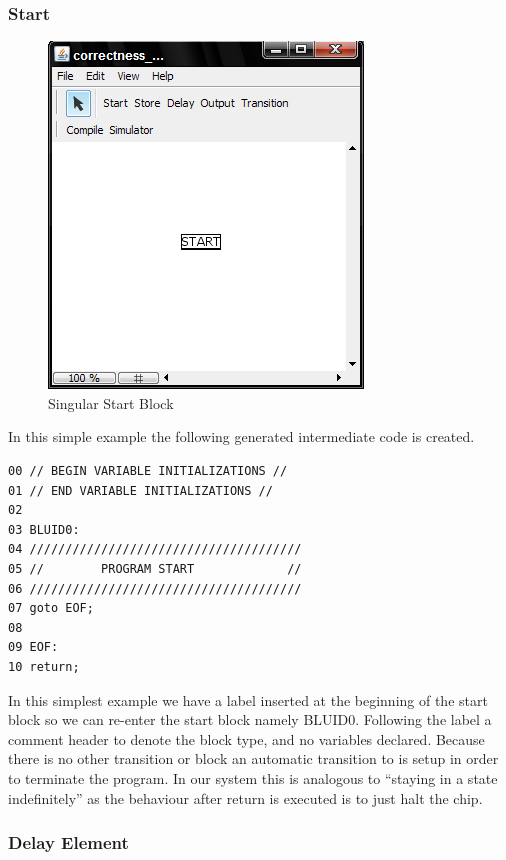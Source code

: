 \subsubsection{Start}
\begin{figure}[htb]
	\centering
	\includegraphics[width=\imgmedphoto]{./images/correctness_ex_start.png}
	\caption{Singular Start Block}
	\label{fig:correctness_ex_start}
\end{figure}
In this simple example the following generated intermediate code  is created.

\begin{minipage}{\textwidth}
\begin{lstlisting}[frame=single]
00 // BEGIN VARIABLE INITIALIZATIONS //
01 // END VARIABLE INITIALIZATIONS //
02
03 BLUID0:
04 //////////////////////////////////////
05 //        PROGRAM START             //
06 //////////////////////////////////////
07 goto EOF;
08 
09 EOF:
10 return;
\end{lstlisting}
\end{minipage}

In this simplest example we have a label inserted at the beginning of the start block so we can re-enter the start block namely BLUID0. Following the label a comment header to denote the block type, and no variables declared.  Because there is no other transition or block an automatic transition to  is setup in order to terminate the program. In our system this is analogous to ``staying in a state indefinitely'' as the behaviour after return is executed is to just halt the chip.


\subsubsection{Delay Element}

